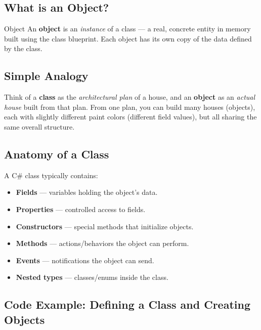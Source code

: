 \documentclass[11pt,a4paper]{article}
\begin{document}
\subsection{What is an Object?}

\begin{defnBox}{Object}
An \textbf{object} is an \textit{instance} of a class — a real, concrete entity in memory built using the class blueprint. Each object has its own copy of the data defined by the class.
\end{defnBox}

\subsection{Simple Analogy}

Think of a \textbf{class} as the \textit{architectural plan} of a house, and an \textbf{object} as an \textit{actual house} built from that plan. From one plan, you can build many houses (objects), each with slightly different paint colors (different field values), but all sharing the same overall structure.

\subsection{Anatomy of a Class}

A C\# class typically contains:
\begin{itemize}[leftmargin=*]
    \item \textbf{Fields} — variables holding the object's data.
    \item \textbf{Properties} — controlled access to fields.
    \item \textbf{Constructors} — special methods that initialize objects.
    \item \textbf{Methods} — actions/behaviors the object can perform.
    \item \textbf{Events} — notifications the object can send.
    \item \textbf{Nested types} — classes/enums inside the class.
\end{itemize}

\subsection{Code Example: Defining a Class and Creating Objects}
\end{document}
